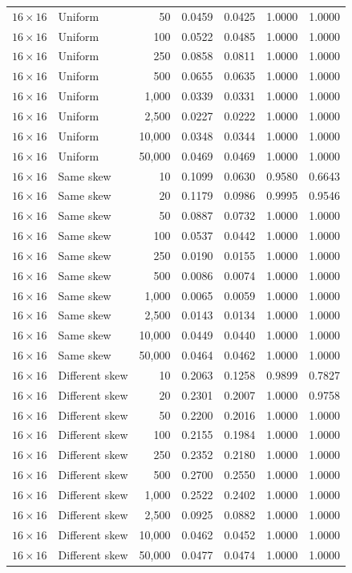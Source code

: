 \begin{longtable}{@{}llrrrrr@{}}
\(16\times16\) & Uniform & 50 & 0.0459 & 0.0425 & 1.0000 & 1.0000\\
\(16\times16\) & Uniform & 100 & 0.0522 & 0.0485 & 1.0000 & 1.0000\\
\(16\times16\) & Uniform & 250 & 0.0858 & 0.0811 & 1.0000 & 1.0000\\
\(16\times16\) & Uniform & 500 & 0.0655 & 0.0635 & 1.0000 & 1.0000\\
\(16\times16\) & Uniform & 1,000 & 0.0339 & 0.0331 & 1.0000 & 1.0000\\
\(16\times16\) & Uniform & 2,500 & 0.0227 & 0.0222 & 1.0000 & 1.0000\\
\(16\times16\) & Uniform & 10,000 & 0.0348 & 0.0344 & 1.0000 & 1.0000\\
\(16\times16\) & Uniform & 50,000 & 0.0469 & 0.0469 & 1.0000 & 1.0000\\
\(16\times16\) & Same skew & 10 & 0.1099 & 0.0630 & 0.9580 & 0.6643\\
\(16\times16\) & Same skew & 20 & 0.1179 & 0.0986 & 0.9995 & 0.9546\\
\(16\times16\) & Same skew & 50 & 0.0887 & 0.0732 & 1.0000 & 1.0000\\
\(16\times16\) & Same skew & 100 & 0.0537 & 0.0442 & 1.0000 & 1.0000\\
\(16\times16\) & Same skew & 250 & 0.0190 & 0.0155 & 1.0000 & 1.0000\\
\(16\times16\) & Same skew & 500 & 0.0086 & 0.0074 & 1.0000 & 1.0000\\
\(16\times16\) & Same skew & 1,000 & 0.0065 & 0.0059 & 1.0000 & 1.0000\\
\(16\times16\) & Same skew & 2,500 & 0.0143 & 0.0134 & 1.0000 & 1.0000\\
\(16\times16\) & Same skew & 10,000 & 0.0449 & 0.0440 & 1.0000 & 1.0000\\
\(16\times16\) & Same skew & 50,000 & 0.0464 & 0.0462 & 1.0000 & 1.0000\\
\(16\times16\) & Different skew & 10 & 0.2063 & 0.1258 & 0.9899 & 0.7827\\
\(16\times16\) & Different skew & 20 & 0.2301 & 0.2007 & 1.0000 & 0.9758\\
\(16\times16\) & Different skew & 50 & 0.2200 & 0.2016 & 1.0000 & 1.0000\\
\(16\times16\) & Different skew & 100 & 0.2155 & 0.1984 & 1.0000 & 1.0000\\
\(16\times16\) & Different skew & 250 & 0.2352 & 0.2180 & 1.0000 & 1.0000\\
\(16\times16\) & Different skew & 500 & 0.2700 & 0.2550 & 1.0000 & 1.0000\\
\(16\times16\) & Different skew & 1,000 & 0.2522 & 0.2402 & 1.0000 & 1.0000\\
\(16\times16\) & Different skew & 2,500 & 0.0925 & 0.0882 & 1.0000 & 1.0000\\
\(16\times16\) & Different skew & 10,000 & 0.0462 & 0.0452 & 1.0000 & 1.0000\\
\(16\times16\) & Different skew & 50,000 & 0.0477 & 0.0474 & 1.0000 & 1.0000\\
\midrule
\bottomrule
\end{longtable}
